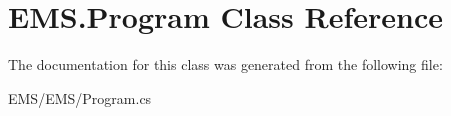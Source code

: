 \hypertarget{class_e_m_s_1_1_program}{\section{E\-M\-S.\-Program Class Reference}
\label{class_e_m_s_1_1_program}
}


The documentation for this class was generated from the following file\-:\begin{DoxyCompactItemize}
\item 
E\-M\-S/\-E\-M\-S/Program.\-cs\end{DoxyCompactItemize}
